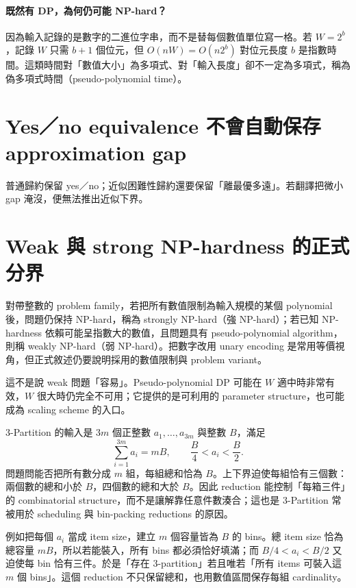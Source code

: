 \documentclass[11pt,a4paper,oneside,openany]{book}
\begin{document}
\paragraph{既然有 DP，為何仍可能 NP-hard？}
因為輸入記錄的是數字的二進位字串，而不是替每個數值單位寫一格。若 $W=2^b$，記錄 $W$ 只需 $b+1$ 個位元，但 $O(nW)=O(n2^b)$ 對位元長度 $b$ 是指數時間。這類時間對「數值大小」為多項式、對「輸入長度」卻不一定為多項式，稱為偽多項式時間（pseudo-polynomial time）。

\section{Yes／no equivalence 不會自動保存 approximation gap}
\begin{coreintuition}
普通歸約保留 yes／no；近似困難性歸約還要保留「離最優多遠」。若翻譯把微小 gap 淹沒，便無法推出近似下界。
\end{coreintuition}

\section{Weak 與 strong NP-hardness 的正式分界}
對帶整數的 problem family，若把所有數值限制為輸入規模的某個 polynomial 後，問題仍保持 NP-hard，稱為 strongly NP-hard（強 NP-hard）；若已知 NP-hardness 依賴可能呈指數大的數值，且問題具有 pseudo-polynomial algorithm，則稱 weakly NP-hard（弱 NP-hard）。把數字改用 unary encoding 是常用等價視角，但正式敘述仍要說明採用的數值限制與 problem variant。

這不是說 weak 問題「容易」。Pseudo-polynomial DP 可能在 $W$ 適中時非常有效，$W$ 很大時仍完全不可用；它提供的是可利用的 parameter structure，也可能成為 scaling scheme 的入口。

3-Partition 的輸入是 $3m$ 個正整數 $a_1,\ldots,a_{3m}$ 與整數 $B$，滿足
\[
 \sum_{i=1}^{3m}a_i=mB,
 \qquad \frac{B}{4}<a_i<\frac{B}{2}.
\]
問題問能否把所有數分成 $m$ 組，每組總和恰為 $B$。上下界迫使每組恰有三個數：兩個數的總和小於 $B$，四個數的總和大於 $B$。因此 reduction 能控制「每箱三件」的 combinatorial structure，而不是讓解靠任意件數湊合；這也是 3-Partition 常被用於 scheduling 與 bin-packing reductions 的原因。

例如把每個 $a_i$ 當成 item size，建立 $m$ 個容量皆為 $B$ 的 bins。總 item size 恰為總容量 $mB$，所以若能裝入，所有 bins 都必須恰好填滿；而 $B/4<a_i<B/2$ 又迫使每 bin 恰有三件。於是「存在 3-partition」若且唯若「所有 items 可裝入這 $m$ 個 bins」。這個 reduction 不只保留總和，也用數值區間保存每組 cardinality。
\end{document}
